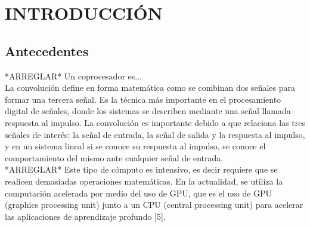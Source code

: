 \renewcommand\thechapter{\Roman{chapter}}
\chapter{INTRODUCCIÓN} \label{ch:intro} \thispagestyle{fancy} 
\renewcommand\thechapter{\arabic{chapter}}

\section{Antecedentes}
*ARREGLAR* 
Un coprocesador es... \\

La convolución define en forma matemática como se combinan dos señales para formar una tercera señal. Es la técnica más importante en el procesamiento digital de señales, donde los sistemas se describen mediante una señal llamada respuesta al impulso. La convolución es importante debido a que relaciona las tres señales de interés: la señal de entrada, la señal de salida y la respuesta al impulso, y en un sistema lineal si se conoce su respuesta al impulso, se conoce el comportamiento del mismo ante cualquier señal de entrada. \\

*ARREGLAR* Este tipo de cómputo es intensivo, es decir requiere que se realicen demasiadas operaciones matemáticas. En la actualidad, se utiliza la computación acelerada por medio del uso de GPU, que es el uso de GPU (graphics processing unit) junto a un CPU (central processing unit) para acelerar las aplicaciones de aprendizaje profundo [5].\\ 

